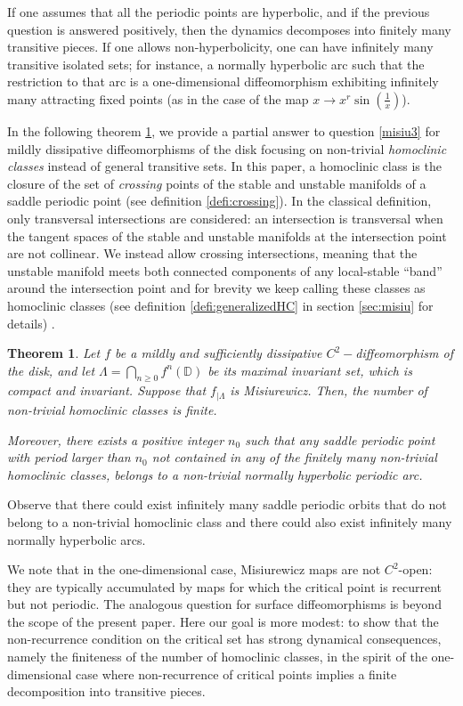 \documentclass[a4paper,11pt]{article}
\newtheorem{theorem}{Theorem}
\theoremstyle{definition}
\def\DD{{\mathbb D}}
\def\La{\Lambda}
\def\La{\Lambda}
\begin{document}
If one  assumes that all the periodic points are hyperbolic, and  if the previous question is answered positively, then the dynamics  decomposes into finitely many transitive pieces. If one allows non-hyperbolicity,  one can have infinitely many  transitive isolated sets; for instance,  a normally hyperbolic arc such that the restriction to that arc is a one-dimensional diffeomorphism exhibiting infinitely many attracting fixed points (as in the case of the map $x\to x^r\sin(\frac 1{x})$). 

In the following theorem \ref{thm:finite classes}, we provide  a partial answer  to question \ref{misiu3} for mildly dissipative diffeomorphisms of the disk  focusing on non-trivial {\it homoclinic classes} instead of general transitive sets. In this paper, a homoclinic class is the closure of the set of  {\it crossing} points of the stable and unstable manifolds of a saddle periodic point (see definition \ref{defi:crossing}).    In the classical definition, only transversal intersections are considered: an intersection is transversal when the tangent spaces of the stable and unstable manifolds at the intersection point are not collinear. We instead allow crossing intersections, meaning that the unstable manifold meets both connected components of any local-stable ``band'' around the intersection point and for brevity we keep calling  these classes as homoclinic classes (see definition \ref{defi:generalizedHC} in section \ref{sec:misiu} for details) .


\begin{theorem}\label{thm:finite classes} Let $f$ be a mildly and sufficiently dissipative     $C^2-$diffeomor\-phism of the disk, and let
$\La=\bigcap_{n\geq 0}f^n(\DD)$ be its maximal invariant set, which is
compact and invariant. Suppose that  $f_{|\La}$ is Misiurewicz. Then, the number of non-trivial  homoclinic classes is finite.

Moreover, there exists a positive integer $n_0$ such that any saddle periodic point  with period larger than $n_0$ not contained in any of the finitely many non-trivial homoclinic classes,  belongs to  a non-trivial  normally hyperbolic periodic arc.
    
\end{theorem}

 Observe that there could exist infinitely many saddle periodic orbits that do not belong to a non-trivial homoclinic class and there  could also exist infinitely many normally hyperbolic arcs. 

We note that in the one-dimensional case, Misiurewicz maps are not $C^2$-open:
they are typically accumulated by maps for which the critical point is recurrent
but not periodic. The analogous question for surface diffeomorphisms is beyond
the scope of the present paper. Here our goal is more modest: to show that the
non-recurrence condition on the critical set has strong dynamical consequences,
namely the finiteness of the number of homoclinic classes, in the spirit of the
one-dimensional case where non-recurrence of critical points implies a finite
decomposition into transitive pieces.
\end{document}
